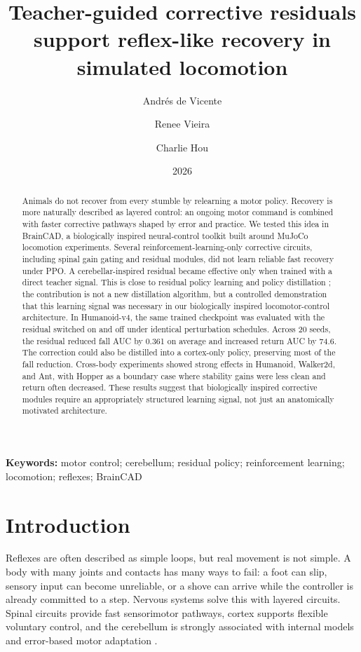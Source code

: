 \documentclass[11pt]{article}
\title{Teacher-guided corrective residuals support reflex-like recovery in simulated locomotion}
\author[1,*]{Andr\'es de Vicente}
\author[1,*]{Renee Vieira}
\author[1,*]{Charlie Hou}
\affil[1]{Neuromatch Impact Scholars Program, Team RNNematode}
\affil[*]{Equal contribution}
\date{2026}
\begin{document}
\maketitle

\textbf{Keywords:} motor control; cerebellum; residual policy; reinforcement learning; locomotion; reflexes; BrainCAD

\begin{abstract}
Animals do not recover from every stumble by relearning a motor policy.  Recovery is more naturally described as layered control: an ongoing motor command is combined with faster corrective pathways shaped by error and practice.  We tested this idea in BrainCAD, a biologically inspired neural-control toolkit built around MuJoCo locomotion experiments.  Several reinforcement-learning-only corrective circuits, including spinal gain gating and residual modules, did not learn reliable fast recovery under PPO.  A cerebellar-inspired residual became effective only when trained with a direct teacher signal.  This is close to residual policy learning and policy distillation \citep{johannink2018residualrl,rusu2015policydistillation,schmitt2018kickstarting}; the contribution is not a new distillation algorithm, but a controlled demonstration that this learning signal was necessary in our biologically inspired locomotor-control architecture.  In Humanoid-v4, the same trained checkpoint was evaluated with the residual switched on and off under identical perturbation schedules.  Across 20 seeds, the residual reduced fall AUC by 0.361 on average and increased return AUC by 74.6.  The correction could also be distilled into a cortex-only policy, preserving most of the fall reduction.  Cross-body experiments showed strong effects in Humanoid, Walker2d, and Ant, with Hopper as a boundary case where stability gains were less clean and return often decreased.  These results suggest that biologically inspired corrective modules require an appropriately structured learning signal, not just an anatomically motivated architecture.
\end{abstract}

\section*{Introduction}
Reflexes are often described as simple loops, but real movement is not simple.  A body with many joints and contacts has many ways to fail: a foot can slip, sensory input can become unreliable, or a shove can arrive while the controller is already committed to a step.  Nervous systems solve this with layered circuits.  Spinal circuits provide fast sensorimotor pathways, cortex supports flexible voluntary control, and the cerebellum is strongly associated with internal models and error-based motor adaptation \citep{wolpert1998internalmodels,ito2008control,seidler2013errorbased}.
\end{document}
